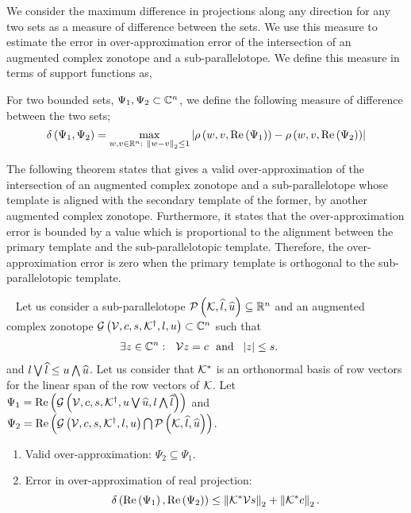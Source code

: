 %
We consider the maximum difference in projections along any direction
for any two sets as a measure of difference between the sets.  We use
this measure to estimate the error in over-approximation error of the
intersection of an augmented complex zonotope and a
sub-parallelotope.  We define this measure in terms of support
functions as,
%
\begin{definition}
For two
bounded sets, $\Psi_1,\Psi_2\subset\mathbb{C}^n$,
we define the following measure of difference between the two sets;
\[
\delta\left(\Psi_1,\Psi_2\right)=\max_{w,v\in\mathbb{R}^n:~\left\|w-v\right\|_2\leq
  1}\left|\rho\left(w,v,\operatorname{Re}\left(\Psi_1\right)\right)-\rho\left(w,v,\operatorname{Re}\left(\Psi_2\right)\right)\right|
\]
%
\end{definition}
%
The following theorem states that gives a valid over-approximation of the
intersection of an augmented complex zonotope and a sub-parallelotope
whose template is aligned with the secondary template of the former,
by another augmented complex zonotope.  Furthermore, it states that
the over-approximation error is bounded by a value
which is proportional to the alignment between the primary template
and the sub-parallelotopic template.  Therefore, the
over-approximation error is zero when the primary template is
orthogonal to the sub-parallelotopic template.
%
\begin{theorem}~\label{thm:acz-ptope-intersection}
Let us consider a sub-parallelotope $\mathcal{P}\left(\mathcal{K},\widehat{l},\widehat{u}\right)\subseteq\mathbb{R}^n$ and an
augmented complex zonotope
$\mathcal{G}\left(\mathcal{V},c,s,{\mathcal{K}}^\dagger,l,u\right)\subset\mathbb{C}^n$
such that 
%
\begin{align}
& \exists z\in\mathbb{C}^n:~~\mathcal{V} z=c~~\text{and}~~\left|z\right|\leq s.~\label{eqn:contain-origin}
\end{align}
%
and $l\bigvee \widehat{l}\leq u\bigwedge \widehat{u}$.  Let us consider that $\mathcal{K}^*$
is an orthonormal basis of row vectors for the linear span of the row
vectors of $\mathcal{K}$.  Let
$\Psi_1=\operatorname{Re}\left(\mathcal{G}\left(\mathcal{V},c,s,{\mathcal{K}}^\dagger,u\bigvee \widehat{u},l\bigwedge \widehat{l}\right)\right)$ and
$\Psi_2=\operatorname{Re}\left(\mathcal{G}\left(\mathcal{V},c,s,{\mathcal{K}}^\dagger,l,u\right)\bigcap \mathcal{P}\left(\mathcal{K},\widehat{l},\widehat{u}\right)\right)$.
%
\begin{enumerate}
\item Valid over-approximation: $\Psi_2\subseteq\Psi_1$.
\item Error in over-approximation of real
  projection: \[\delta\left(\operatorname{Re}\left(\Psi_1\right),\operatorname{Re}\left(\Psi_2\right)\right)\leq
  \left\|\mathcal{K}^*\mathcal{V}s\right\|_{2}+\left\|\mathcal{K}^*c\right\|_{2}.\]
\end{enumerate}
%
\end{theorem}
